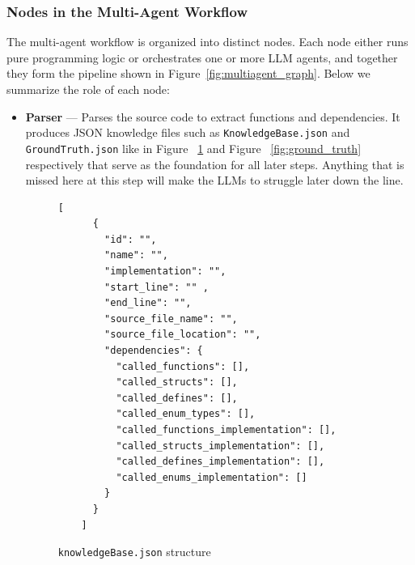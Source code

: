 \documentclass[conference]{IEEEtran}
\begin{document}
\subsubsection*{\textbf{Nodes in the Multi-Agent Workflow}}
The multi-agent workflow is organized into distinct nodes. Each node either runs pure programming logic or orchestrates one or more LLM agents, and together they form the pipeline shown in Figure~\ref{fig:multiagent_graph}. Below we summarize the role of each node:

{\small
\begin{itemize}
  \item \textbf{Parser} — Parses the source code to extract functions and dependencies. It produces JSON knowledge files such as \texttt{KnowledgeBase.json}  and \texttt{GroundTruth.json} like in Figure ~\ref{fig:knowledge_base} and Figure ~\ref{fig:ground_truth} respectively that serve as the foundation for all later steps. Anything that is missed here at this step will make the LLMs to struggle later down the line.

{\small
\begin{figure}[h]
  \centering
  \begin{lstlisting}[style=cstyle,
    breaklines=true,
    breakatwhitespace=false,
    columns=fullflexible,
    keepspaces=true,
    breakindent=0pt,
    postbreak=\mbox{\textcolor{gray}{$\hookrightarrow$}\space},
    basicstyle=\ttfamily\scriptsize]
    [ 
      { 
        "id": "", 
        "name": "", 
        "implementation": "", 
        "start_line": "" , 
        "end_line": "", 
        "source_file_name": "", 
        "source_file_location": "", 
        "dependencies": { 
          "called_functions": [], 
          "called_structs": [], 
          "called_defines": [], 
          "called_enum_types": [], 
          "called_functions_implementation": [], 
          "called_structs_implementation": [], 
          "called_defines_implementation": [], 
          "called_enums_implementation": [] 
        } 
      } 
    ] 
  \end{lstlisting}
  \caption{\texttt{knowledgeBase.json} structure}
  \label{fig:knowledge_base}
\end{figure}
}


\end{itemize}}
\end{document}
